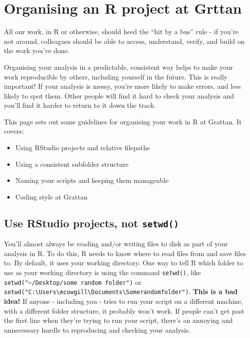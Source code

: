 \documentclass[]{book}
\providecommand{\tightlist}{%
  \setlength{\itemsep}{0pt}\setlength{\parskip}{0pt}}
\begin{document}
\hypertarget{organising-an-r-project-at-grttan}{%
\chapter{Organising an R project at Grttan}\label{organising-an-r-project-at-grttan}}

All our work, in R or otherwise, should heed the ``hit by a bus'' rule - if you're not around, colleagues should be able to access, understand, verify, and build on the work you've done.

Organising your analysis in a predictable, consistent way helps to make your work reproducible by others, including yourself in the future. This is really important! If your analysis is messy, you're more likely to make errors, and less likely to spot them. Other people will find it hard to check your analysis and you'll find it harder to return to it down the track.

This page sets out some guidelines for organising your work in R at Grattan. It covers:

\begin{itemize}
\tightlist
\item
  Using RStudio projects and relative filepaths
\item
  Using a consistent subfolder structure
\item
  Naming your scripts and keeping them manageable
\item
  Coding style at Grattan
\end{itemize}

\hypertarget{use-rstudio-projects-not-setwd}{%
\section{\texorpdfstring{Use RStudio projects, not \texttt{setwd()}}{Use RStudio projects, not setwd()}}\label{use-rstudio-projects-not-setwd}}

You'll almost always be reading and/or writing files to disk as part of your analysis in R. To do this, R needs to know where to read files from and save files to. By default, it uses your working directory.
One way to tell R which folder to use as your working directory is using the command \texttt{setwd()}, like \texttt{setwd("\textasciitilde{}/Desktop/some\ random\ folder")} or \texttt{setwd("C:\textbackslash{}Users\textbackslash{}mcowgill\textbackslash{}Documents\textbackslash{}Somerandomfolder")}. \textbf{This is a bad idea!} If anyone - including you - tries to run your script on a different machine, with a different folder structure, it probably won't work. If people can't get past the first line when they're trying to run your script, there's an annoying and unnecessary hurdle to reproducing and checking your analysis.
\end{document}
